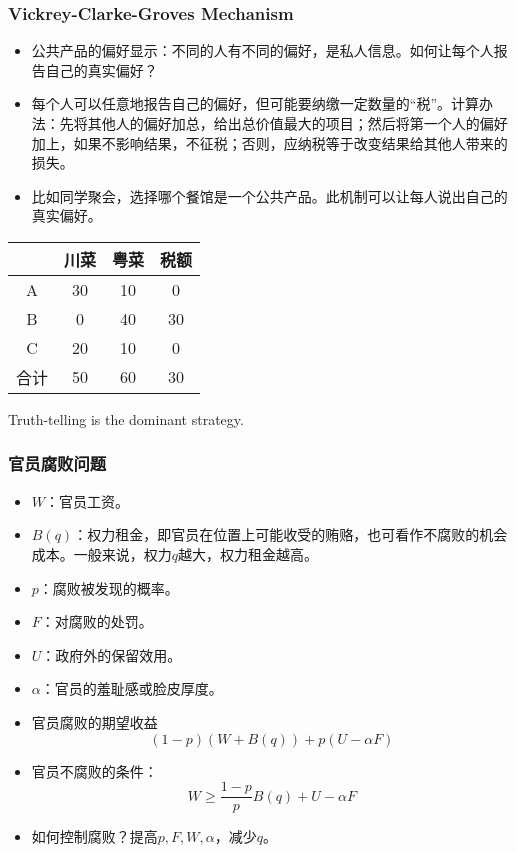 \documentclass[UTF8,11pt,colorlinks,compress,openany]{beamer}%
\begin{document}
\begin{frame}\frametitle{Vickrey-Clarke-Groves Mechanism}
\begin{itemize}
	\item 公共产品的偏好显示：不同的人有不同的偏好，是私人信息。如何让每个人报告自己的真实偏好？
	\item 每个人可以任意地报告自己的偏好，但可能要纳缴一定数量的“税”。计算办法：先将其他人的偏好加总，给出总价值最大的项目；然后将第一个人的偏好加上，如果不影响结果，不征税；否则，应纳税等于改变结果给其他人带来的损失。
	\item 比如同学聚会，选择哪个餐馆是一个公共产品。此机制可以让每人说出自己的真实偏好。
\end{itemize}
\begin{table}
\begin{tabu}{c|c|c|c}
\hline
	& 川菜 & 粤菜 & 税额 \\
\hline
A & 30 & 10 & 0 \\
B & 0 & 40 & 30 \\
C & 20 & 10 & 0 \\
\hline
合计 & 50 & 60 & 30\\
\hline
\end{tabu}
\end{table}
Truth-telling is the dominant strategy.
\end{frame}

\begin{frame}\frametitle{官员腐败问题}
\begin{itemize}
	\item $W$：官员工资。
	\item $B(q)$：权力租金，即官员在位置上可能收受的贿赂，也可看作不腐败的机会成本。一般来说，权力$q$越大，权力租金越高。
	\item $p$：腐败被发现的概率。
	\item $F$：对腐败的处罚。
	\item $U$：政府外的保留效用。
	\item $\alpha$：官员的羞耻感或脸皮厚度。
	\item 官员腐败的期望收益
	\[(1-p)(W+B(q))+p(U-\alpha F)\]
	\item 官员不腐败的条件：
	\[W\geq \frac{1-p}{p}B(q)+U-\alpha F\]
	\item 如何控制腐败？提高$p,F,W,\alpha$，减少$q$。
\end{itemize}
\end{frame}
\end{document}
